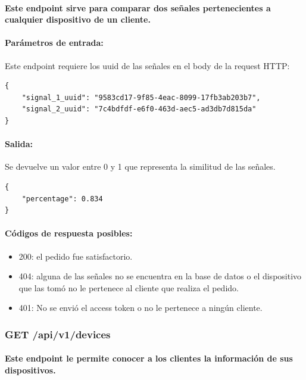 \documentclass{article}
\begin{document}
\paragraph{
Este endpoint sirve para comparar dos señales pertenecientes a cualquier dispositivo de un cliente.
}

\paragraph{
Parámetros de entrada:}
Este endpoint requiere los uuid de las señales en el body de la request HTTP:

\begin{verbatim}
{
    "signal_1_uuid": "9583cd17-9f85-4eac-8099-17fb3ab203b7",
    "signal_2_uuid": "7c4bdfdf-e6f0-463d-aec5-ad3db7d815da"
}

\end{verbatim}

\paragraph{
Salida:}
Se devuelve un valor entre 0 y 1 que representa la similitud de las señales.

\begin{verbatim}
{
    "percentage": 0.834
}
\end{verbatim}

\paragraph{
Códigos de respuesta posibles:
}
\begin{itemize}
    \item 200: el pedido fue satisfactorio.
    \item 404: alguna de las señales no se encuentra en la base de datos o el dispositivo que las tomó no le pertenece al cliente que realiza el pedido.
    \item 401: No se envió el access token o no le pertenece a ningún cliente.
\end{itemize}

\subsubsection{GET /api/v1/devices}
\paragraph{
Este endpoint le permite conocer a los clientes la información de sus dispositivos.
}
\end{document}
